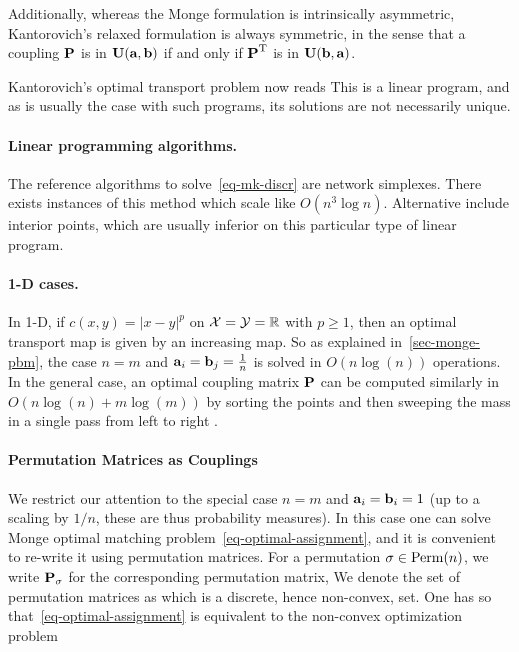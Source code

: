 %
Additionally, whereas the Monge formulation is intrinsically asymmetric, Kantorovich's relaxed formulation is always symmetric, in the sense that a coupling $\P$ is in  $\CouplingsD(\a,\b)$ if and only if  $\transp{\P}$ is in $\CouplingsD(\b,\a)$.

Kantorovich's optimal transport problem now reads
This is a linear program, and as is usually the case with such programs, its solutions are not necessarily unique. 



\paragraph{Linear programming algorithms.}

The reference algorithms to solve~\eqref{eq-mk-discr} are network simplexes. There exists instances of this method which scale like  $O(n^3 \log n)$. Alternative include interior points, which are usually inferior on this particular type of linear program.

\paragraph{1-D cases.}

In 1-D, if $c(x,y)=|x-y|^p$ on $\Xx=\Yy=\RR$ with $p \geq 1$, then an optimal transport map is given by an increasing map. So as explained in~\eqref{sec-monge-pbm}, the case $n=m$ and $\a_i=\b_j=\frac{1}{n}$ is solved in $O(n \log(n))$ operations. 
%
In the general case, an optimal coupling matrix $\P$ can be computed similarly in $O(n\log(n)+m\log(m))$ by sorting the points and then sweeping the mass in a single pass from left to right .


\paragraph{Permutation Matrices as Couplings} 

We restrict our attention to the special case $n=m$ and $\a_i=\b_i=1$ (up to a scaling by $1/n$, these are thus probability measures).
%
In this case one can solve Monge optimal matching problem~\eqref{eq-optimal-assignment}, and it is convenient to re-write it using permutation matrices. 
%
For a permutation $\si\in\Perm(n)$, we write $\P_{\si}$ for the corresponding permutation matrix,
We denote the set of permutation matrices as
which is a discrete, hence non-convex, set. One has
so that~\eqref{eq-optimal-assignment} is equivalent to the non-convex optimization problem

